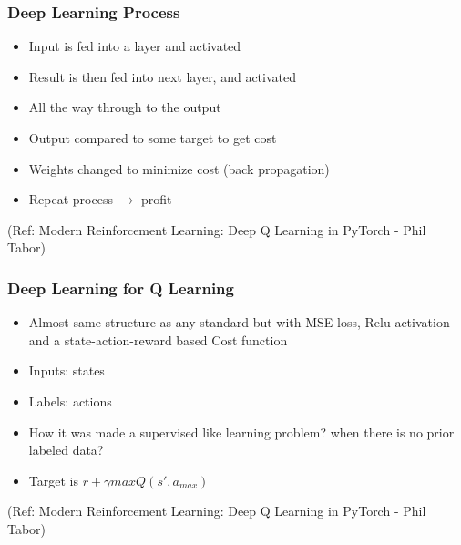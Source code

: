 \begin{frame}[fragile]\frametitle{Deep Learning Process}


\begin{itemize}
\item Input is fed into a layer and activated 
\item Result is then fed into next layer, and activated 
\item All the way through to the output
\item Output compared to some target to get cost 
\item  Weights changed to minimize cost (back propagation)
\item Repeat process $\rightarrow$ profit
\end{itemize}

{\tiny (Ref: Modern Reinforcement Learning: Deep Q Learning in PyTorch - Phil Tabor)}

\end{frame}

\begin{frame}[fragile]\frametitle{Deep Learning for Q Learning}


\begin{itemize}
\item Almost same structure as any standard but with MSE loss, Relu activation and a state-action-reward based Cost function
\item Inputs: states
\item Labels: actions
\item How it was made a supervised like learning problem? when there is no prior labeled data?
\item Target is $r + \gamma max Q(s',a_{max})$
\end{itemize}

{\tiny (Ref: Modern Reinforcement Learning: Deep Q Learning in PyTorch - Phil Tabor)}

\end{frame}